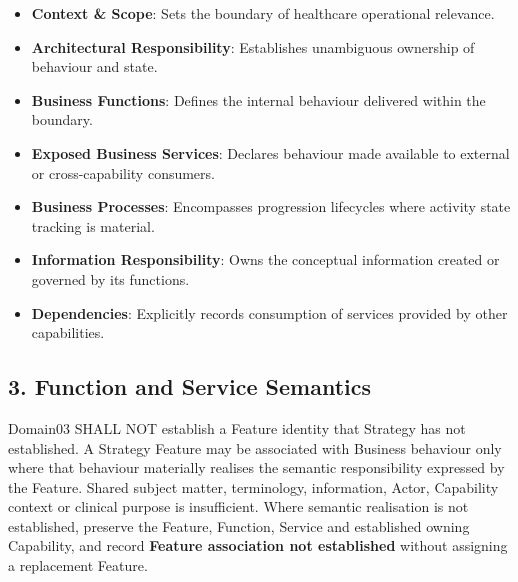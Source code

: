 \begin{itemize}

\item 
\textbf{Context \& Scope}: Sets the boundary of healthcare operational relevance.



\item 
\textbf{Architectural Responsibility}: Establishes unambiguous ownership of behaviour and state.



\item 
\textbf{Business Functions}: Defines the internal behaviour delivered within the boundary.



\item 
\textbf{Exposed Business Services}: Declares behaviour made available to external or cross-capability consumers.



\item 
\textbf{Business Processes}: Encompasses progression lifecycles where activity state tracking is material.



\item 
\textbf{Information Responsibility}: Owns the conceptual information created or governed by its functions.



\item 
\textbf{Dependencies}: Explicitly records consumption of services provided by other capabilities.



\end{itemize}
\label{rad:metamodel:91}

\par\smallskip
{}\label{rad:metamodel:93}
\subsection*{3. Function and Service Semantics}
\label{rad:metamodel:95}

Domain03 SHALL NOT establish a Feature identity that Strategy has not established. A Strategy Feature may be associated with Business behaviour only where that behaviour materially realises the semantic responsibility expressed by the Feature. Shared subject matter, terminology, information, Actor, Capability context or clinical purpose is insufficient. Where semantic realisation is not established, preserve the Feature, Function, Service and established owning Capability, and record \textbf{Feature association not established} without assigning a replacement Feature.

